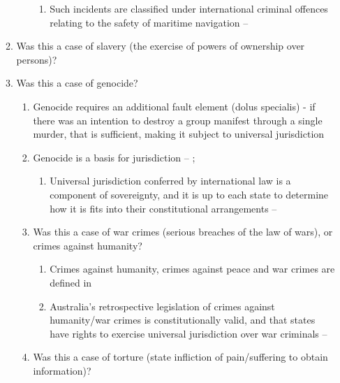 \begin{enumerate}
\begin{enumerate}
\begin{enumerate}
\begin{enumerate}
                \item Such incidents are classified under international criminal offences relating to the safety of maritime navigation -- 
            \end{enumerate}
        \end{enumerate}
        \item Was this a case of slavery (the exercise of powers of ownership over persons)?
        \item Was this a case of genocide?
        \begin{enumerate}
            \item Genocide requires an additional fault element (dolus specialis) - if there was an intention to destroy a group manifest through a single murder, that is sufficient, making it subject to universal jurisdiction
            \item Genocide is a basis for jurisdiction -- ; 
            \begin{enumerate}
                \item Universal jurisdiction conferred by international law is a component of sovereignty, and it is up to each state to determine how it is fits into their constitutional arrangements -- 
            \end{enumerate}
        \item Was this a case of war crimes (serious breaches of the law of wars), or crimes against humanity?
        \begin{enumerate}
            \item Crimes against humanity, crimes against peace and war crimes are defined in 
            \item Australia's retrospective legislation of crimes against humanity/war crimes is constitutionally valid, and that states have rights to exercise universal jurisdiction over war criminals -- 
        \end{enumerate}
        \item Was this a case of torture (state infliction of pain/suffering to obtain information)?
        \begin{enumerate}

\end{enumerate}
\end{enumerate}
\end{enumerate}
\end{enumerate}
